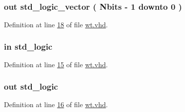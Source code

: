 \subsubsection[{out\+\_\+data}]{ {\bfseries \textcolor{keywordflow}{out}\textcolor{vhdlchar}{ }} {\bfseries \textcolor{comment}{std\+\_\+logic\+\_\+vector}\textcolor{vhdlchar}{ }\textcolor{vhdlchar}{(}\textcolor{vhdlchar}{ }\textcolor{vhdlchar}{ }\textcolor{vhdlchar}{ }\textcolor{vhdlchar}{ }{\bfseries {\bf Nbits}} \textcolor{vhdlchar}{-\/}\textcolor{vhdlchar}{ } \textcolor{vhdldigit}{1} \textcolor{vhdlchar}{ }\textcolor{keywordflow}{downto}\textcolor{vhdlchar}{ }\textcolor{vhdlchar}{ } \textcolor{vhdldigit}{0} \textcolor{vhdlchar}{ }\textcolor{vhdlchar}{)}\textcolor{vhdlchar}{ }} \hspace{0.3cm}{\ttfamily [Port]}}\label{classwt_a44ef009b7a1d3a2266fd763d872c2b76}


Definition at line \hyperlink{wt_8vhd_source_l00018}{18} of file \hyperlink{wt_8vhd_source}{wt.\+vhd}.

\hypertarget{classwt_aad8dc6359d9e23dabcbf342fadf2fa06}{}
\subsubsection[{reset}]{ {\bfseries \textcolor{keywordflow}{in}\textcolor{vhdlchar}{ }} {\bfseries \textcolor{comment}{std\+\_\+logic}\textcolor{vhdlchar}{ }} \hspace{0.3cm}{\ttfamily [Port]}}\label{classwt_aad8dc6359d9e23dabcbf342fadf2fa06}


Definition at line \hyperlink{wt_8vhd_source_l00015}{15} of file \hyperlink{wt_8vhd_source}{wt.\+vhd}.

\hypertarget{classwt_aae281cf725515894f893258c629a59c7}{}
\subsubsection[{sinc}]{ {\bfseries \textcolor{keywordflow}{out}\textcolor{vhdlchar}{ }} {\bfseries \textcolor{comment}{std\+\_\+logic}\textcolor{vhdlchar}{ }} \hspace{0.3cm}{\ttfamily [Port]}}\label{classwt_aae281cf725515894f893258c629a59c7}


Definition at line \hyperlink{wt_8vhd_source_l00016}{16} of file \hyperlink{wt_8vhd_source}{wt.\+vhd}.

